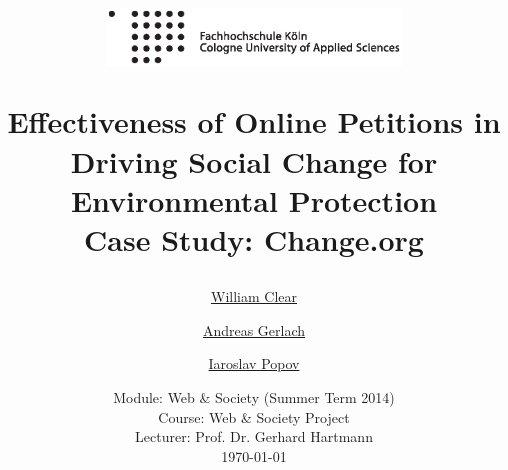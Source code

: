 \documentclass[a4paper]{article}
\begin{document}
	\title{
	\begin{figure}[!ht]
		\flushleft
			\includegraphics[width=0.7\textwidth]{assets/logo.eps}
	\end{figure}
	\vspace{1cm}
	\Huge Effectiveness of Online Petitions in Driving Social Change for Environmental Protection \\
    \large Case Study: Change.org
	}

	\vspace{1cm}


	\author{\Large \href{mailto:william.j.clear@gmail.com}{William Clear} \and \Large \href{mailto:andreas.gerlach@smail.fh-koeln.de}{Andreas Gerlach} \and \Large \href{mailto:iaroslav.popov@gmail.com}{Iaroslav Popov}
	\vspace{1cm}}

	\date{
	\large Module: Web \& Society (Summer Term 2014) \\ Course: Web \& Society Project \\
	\vspace{0.8cm}
	\large Lecturer: Prof. Dr. Gerhard Hartmann \\
	\vspace{1cm}
	\today
	}

	\maketitle
	\setlength{\parindent}{0pt}

\vspace{2cm}

% 







\end{document}
